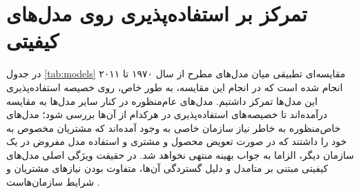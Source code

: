\section{تمرکز بر استفاده‌پذیری روی مدل‌های کیفیتی}
در جدول
\ref{tab:models}
مقایسه‌ای تطبیقی میان مدل‌های مطرح از سال ۱۹۷۰ تا ۲۰۱۱ انجام شده است که در انجام این مقایسه، به طور خاص، روی خصیصه استفاده‌پذیری این مدل‌ها تمرکز داشتیم. مدل‌های عام‌منظوره در کنار سایر مدل‌ها به مقایسه درآمده‌اند تا خصیصه‌های استفاده‌پذیری در هرکدام از آن‌ها بررسی شود؛ مدل‌های خاص‌منظوره به خاطر نیاز سازمان خاصی به وجود آمده‌اند که مشتریان مخصوص به خود را داشتند که در صورت تعویض محصول و مشتری و استفاده مدل مفروض در یک سازمان دیگر، الزاما به جواب بهینه منتهی نخواهد شد. در حقیقت ویژگی اصلی مدل‌های کیفیتی مبتنی بر متامدل و دلیل گستردگی آن‌ها، متفاوت بودن نیازهای مشتریان و شرایط سازمان‌هاست
\cite{sommerville_software_2016}.


